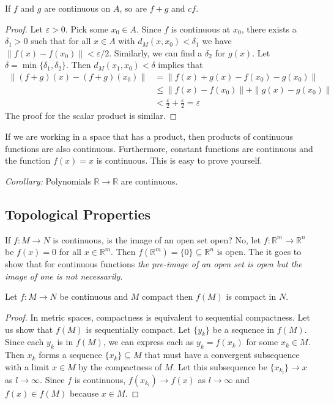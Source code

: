 \documentclass[11pt]{article}
\theoremstyle{definition}
\newcommand{\R}{\mathbb{R}}                      %
\begin{document}
\prop If $f$ and $g$ are continuous on $A$, so are $f+g$ and $cf$.

\begin{proof}
    Let $\varepsilon>0$. Pick some $x_0\in A$. Since $f$ is continuous at $x_0$, there exists a $\delta_1>0$ such that for all $x\in A$ with $d_M(x,x_0)<\delta_1$ we have $\|f(x)-f(x_0)\|<\varepsilon/2$. Similarly, we can find a $\delta_2$ for $g(x)$. Let $\delta = \min\{\delta_1,\delta_2\}$. Then $d_M(x_1,x_0)<\delta$ implies that 
    $$
    \begin{aligned}
    \|(f+g)(x)-(f+g)(x_0)\|&=\|f(x)+g(x)-f(x_0)-g(x_0)\|\\
    &\leq \|f(x)-f(x_0)\|+\|g(x)-g(x_0)\|\\
    &<\frac{\varepsilon}{2}+\frac{\varepsilon}{2}=\varepsilon
    \end{aligned}
    $$
    The proof for the scalar product is similar.
\end{proof}

If we are working in a space that has a product, then products of continuous functions are also continuous. Furthermore, constant functions are continuous and the function $f(x)=x$ is continuous. This is easy to prove yourself.

\textit{Corollary:} Polynomials $\R\to\R$ are continuous.

\subsection{Topological Properties}

If $f:M\to N$ is continuous, is the image of an open set open? No, let $f:\R^m\to\R^n$ be $f(x)=0$ for all $x\in\R^m$. Then $f(\R^m)=\{0\}\subseteq \R^n$ is open. The it goes to show that for continuous functions \textit{the pre-image of an open set is open but the image of one is not necessarily}.

\prop Let $f:M\to N$ be continuous and $M$ compact then $f(M)$ is compact in $N$. 

\begin{proof}
    In metric spaces, compactness is equivalent to sequential compactness. Let us show that $f(M)$ is sequentially compact. Let $\{y_k\}$ be a sequence in $f(M)$. Since each $y_k$ is in $f(M)$, we can express each as $y_k=f(x_k)$ for some $x_k\in M$. Then $x_k$ forms a sequence $\{x_k\}\subseteq M$ that must have a convergent subsequence with a limit $x\in M$ by the compactness of $M$. Let this subsequence be $\{x_{k_l}\}\to x$ as $l\to\infty$. Since $f$ is continuous, $f(x_{k_l})\to f(x)$ as $l\to \infty$ and $f(x)\in f(M)$ because $x\in M$.
\end{proof}
\end{document}
